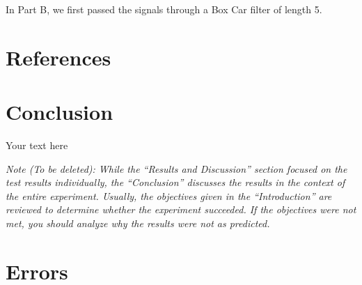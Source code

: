 \documentclass[10pt]{article}
\begin{document}
In Part B, we first passed the signals through a Box Car filter of length 5. 


\medskip


\section{References}

\medskip

\section{Conclusion}

Your text here

\medskip

\textit{Note (To be deleted): While the ``Results and Discussion'' section focused on the test results individually, the ``Conclusion'' discusses the results in the context of the entire experiment. Usually, the objectives given in the ``Introduction'' are reviewed to determine whether the experiment succeeded. If the objectives were not met, you should analyze why the results were not as predicted.}

\section{Errors}
 
\end{document}
